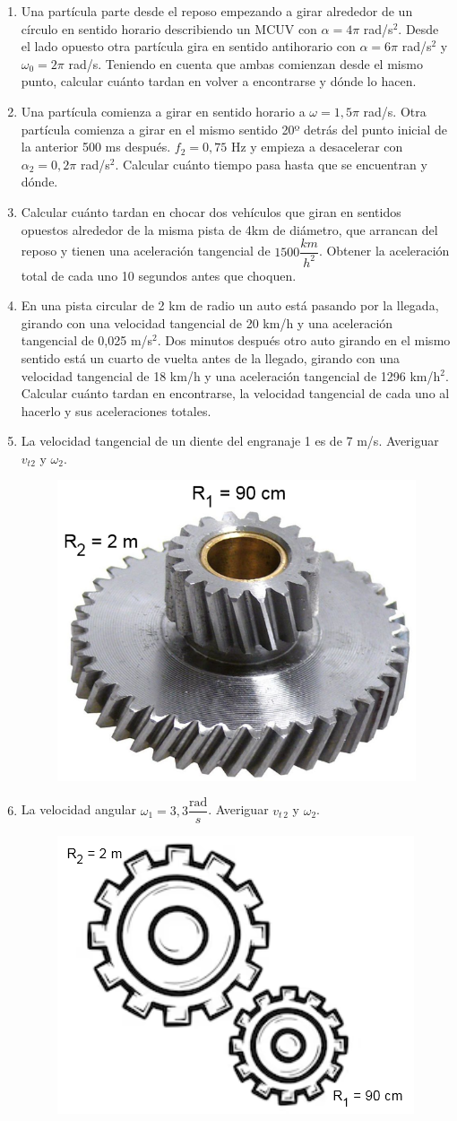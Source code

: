 \begin{enumerate}[label=\arabic*)]
\item Una partícula parte desde el reposo empezando a girar alrededor de un círculo en sentido horario describiendo un MCUV con $\alpha = 4\pi$ rad/s$^2$. Desde el lado opuesto otra partícula gira en sentido antihorario con $\alpha = 6\pi$ rad/s$^2$ y $\omega_0=2\pi$ rad/s. Teniendo en cuenta que ambas comienzan desde el mismo punto, calcular cuánto tardan en volver a encontrarse y dónde lo hacen.

\item Una partícula comienza a girar en sentido horario a $\omega=1,5\pi$ rad/s. Otra partícula comienza a girar en el mismo sentido 20º detrás del punto inicial de la anterior 500 ms después. $f_2 = 0,75$ Hz y empieza a desacelerar con $\alpha_2 = 0,2\pi$ rad/s$^2$. Calcular cuánto tiempo pasa hasta que se encuentran y dónde.

\item Calcular cuánto tardan en chocar dos vehículos que giran en sentidos opuestos alrededor de la misma pista de 4km de diámetro, que arrancan del reposo y tienen una aceleración tangencial de $1500 \dfrac{km}{h^2}$. Obtener la aceleración total de cada uno 10 segundos antes que choquen.

\newpage
\item En una pista circular de 2 km de radio un auto está pasando por la llegada, girando con una velocidad tangencial de 20 km/h y una aceleración tangencial de 0,025 m/s$^2$. Dos minutos después otro auto girando en el mismo sentido está un cuarto de vuelta antes de la llegado, girando con una velocidad tangencial de 18 km/h y una aceleración tangencial de 1296 km/h$^2$. Calcular cuánto tardan en encontrarse, la velocidad tangencial de cada uno al hacerlo y sus aceleraciones totales.


\item La velocidad tangencial de un diente del engranaje 1 es de 7 m/s. Averiguar $v_{t2}$ y $\omega_2$.
\begin{figure}[H]
    \centering
    \includegraphics[width=0.3\linewidth]{images/engranaje_1.png}
\end{figure}

\item La velocidad angular $\omega_1 = 3,3\dfrac{\text{rad}}{s}$. Averiguar $v_{t\,2}$ y $\omega_2$.

\begin{figure}[H]
    \centering
    \includegraphics[width=0.4\linewidth]{images/engranaje_2.png}
\end{figure}    
\end{enumerate}

